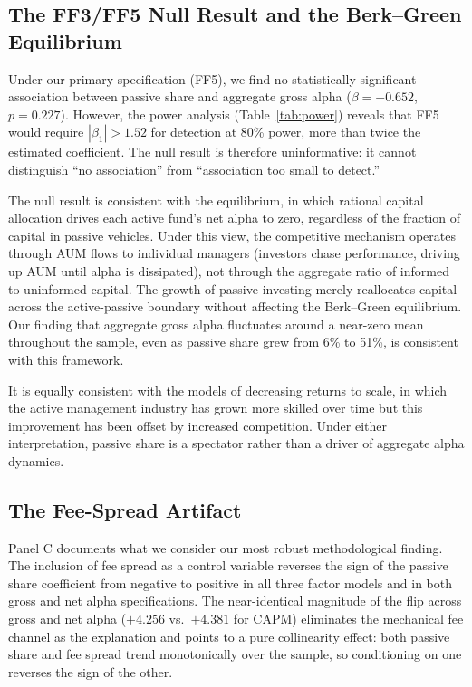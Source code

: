 \documentclass[11pt, a4paper]{article}
\begin{document}
\subsection{The FF3/FF5 Null Result and the Berk--Green Equilibrium}

Under our primary specification (FF5), we find no statistically significant association between passive share and aggregate gross alpha ($\beta = -0.652$, $p = 0.227$). However, the power analysis (Table~\ref{tab:power}) reveals that FF5 would require $|\beta_1| > 1.52$ for detection at 80\% power, more than twice the estimated coefficient. The null result is therefore uninformative: it cannot distinguish ``no association'' from ``association too small to detect.''

The null result is consistent with the \textcite{berk2004} equilibrium, in which rational capital allocation drives each active fund's net alpha to zero, regardless of the fraction of capital in passive vehicles. Under this view, the competitive mechanism operates through AUM flows to individual managers (investors chase performance, driving up AUM until alpha is dissipated), not through the aggregate ratio of informed to uninformed capital. The growth of passive investing merely reallocates capital across the active-passive boundary without affecting the Berk--Green equilibrium. Our finding that aggregate gross alpha fluctuates around a near-zero mean throughout the sample, even as passive share grew from 6\% to 51\%, is consistent with this framework.

It is equally consistent with the \textcite{pastor2012, pastor2015} models of decreasing returns to scale, in which the active management industry has grown more skilled over time but this improvement has been offset by increased competition. Under either interpretation, passive share is a spectator rather than a driver of aggregate alpha dynamics.

\subsection{The Fee-Spread Artifact}

Panel C documents what we consider our most robust methodological finding. The inclusion of fee spread as a control variable reverses the sign of the passive share coefficient from negative to positive in all three factor models and in both gross and net alpha specifications. The near-identical magnitude of the flip across gross and net alpha ($+4.256$ vs.\ $+4.381$ for CAPM) eliminates the mechanical fee channel as the explanation and points to a pure collinearity effect: both passive share and fee spread trend monotonically over the sample, so conditioning on one reverses the sign of the other.
\end{document}
